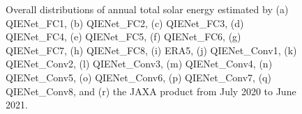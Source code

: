 \documentclass[review]{elsarticle}
\begin{document}
\begin{figure}[!htbp]
{    }
    \vspace{-1mm}
    \caption{Overall distributions of annual total solar energy estimated by (a) QIENet\_FC1, (b) QIENet\_FC2, (c) QIENet\_FC3, (d) QIENet\_FC4, (e) QIENet\_FC5, (f) QIENet\_FC6, (g) QIENet\_FC7, (h) QIENet\_FC8, (i) ERA5, (j) QIENet\_Conv1, (k) QIENet\_Conv2, (l) QIENet\_Conv3, (m) QIENet\_Conv4, (n) QIENet\_Conv5, (o) QIENet\_Conv6, (p) QIENet\_Conv7, (q) QIENet\_Conv8, and (r) the JAXA product from July 2020 to June 2021.}
    \label{fig:irrad_map_year}
\end{figure}
\end{document}
